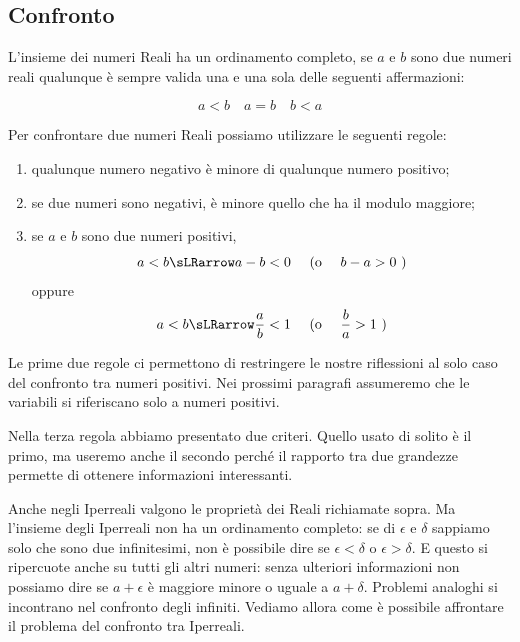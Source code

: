 \subsection{Confronto}
\label{subsec:insnum_confronto}

L'insieme dei numeri Reali ha un ordinamento completo, se $a$ e $b$ sono 
due 
numeri reali qualunque è sempre valida una e una sola delle seguenti 
affermazioni:

\[a<b \quad a=b \quad b<a\]

Per confrontare due numeri Reali possiamo utilizzare le seguenti regole:

\begin{enumerate} [noitemsep]
 \item qualunque numero negativo è minore di qualunque numero positivo;
 \item se due numeri sono negativi, è minore quello che ha il modulo 
maggiore;
 \item se $a$ e $b$ sono due numeri positivi, 
 \[a<b \sLRarrow a-b<0 \quad \text{ (o } \quad b-a>0 \text{ )}\]
oppure
 \[a<b \sLRarrow \frac{a}{b}<1 \quad \text{ (o } \quad \frac{b}{a}>1 
   \text{ )}\]
\end{enumerate}

\begin{osservazione}
Le prime due regole ci permettono di restringere le nostre riflessioni al 
solo caso del confronto tra numeri positivi.
Nei prossimi paragrafi assumeremo che le variabili si riferiscano solo a 
numeri positivi.
\end{osservazione}

\begin{osservazione}
Nella terza regola abbiamo presentato due criteri. Quello usato di solito
è il primo, ma useremo anche il secondo perché il rapporto tra due 
grandezze permette di ottenere informazioni interessanti.
\end{osservazione}

\vspace{1em}

Anche negli Iperreali valgono le proprietà dei Reali richiamate sopra. 
Ma l'insieme degli Iperreali non ha un ordinamento completo:
se di $\epsilon$ e $\delta$ sappiamo solo che sono due infinitesimi,
non è possibile dire se $\epsilon < \delta$ o $\epsilon > \delta$.
E questo si ripercuote anche su tutti gli altri numeri: senza ulteriori 
informazioni non possiamo dire se $a+\epsilon$ è maggiore minore o uguale 
a $a+\delta$. 
Problemi analoghi si incontrano nel confronto degli infiniti.
Vediamo allora come è possibile affrontare il problema del confronto tra 
Iperreali.


